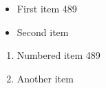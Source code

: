 \documentclass{article}
\begin{document}
\begin{itemize}
\item First item 489
\item Second item
\end{itemize}
\begin{enumerate}
\item Numbered item 489
\item Another item
\end{enumerate}
\end{document}
